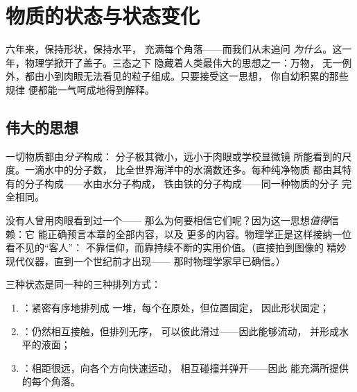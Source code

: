 \chapter{物质的状态与状态变化}\label{ch:g7:states-of-matter}

六年来，保持形状，保持水平，
充满每个角落——而我们从未追问
\emph{为什么}。这一年，物理学掀开了盖子。三态之下
隐藏着人类最伟大的思想之一：万物，
无一例外，都由小到肉眼无法看见的粒子组成。只要接受这一思想，
你自幼积累的那些规律
便都能一气呵成地得到解释。

\section{伟大的思想}

\begin{definition}[分子]\label{def:g7:states-of-matter:molecule}
一切物质都由\emph{分子}构成：
分子极其微小，远小于肉眼或学校显微镜
所能看到的尺度。一滴水中的分子数，
比全世界海洋中的水滴数还多。每种纯净物质
都由其特有的分子构成——水由水分子构成，
铁由铁的分子构成——同一种物质的分子
完全相同。
\end{definition}

\begin{remark}[不见而信]\label{rem:g7:states-of-matter:believing}
没有人曾用肉眼看到过一个——
那么为何要相信它们呢？因为这一思想\emph{值得}信赖：它
能正确预言本章的全部内容，以及
更多的内容。物理学正是这样接纳一位看不见的“客人”：
不靠信仰，而靠持续不断的实用价值。（直接拍到图像的
精妙现代仪器，直到一个世纪前才出现——
那时物理学家早已确信。）
\end{remark}

\begin{proposition}[三态的粒子模型]\label{prop:g7:states-of-matter:model}
三种状态是同一种的三种排列方式：
\begin{enumerate}
  \item \emph{}：紧密有序地排列成
        一堆，每个在原处，但位置固定，
        因此形状固定；
  \item \emph{}：仍然相互接触，但排列无序，
        可以彼此滑过——因此能够流动，
        并形成水平的液面；
  \item \emph{}：相距很远，向各个方向快速运动，
        相互碰撞并弹开——因此
        能充满所提供的每个角落。
\end{enumerate}
\end{proposition}


